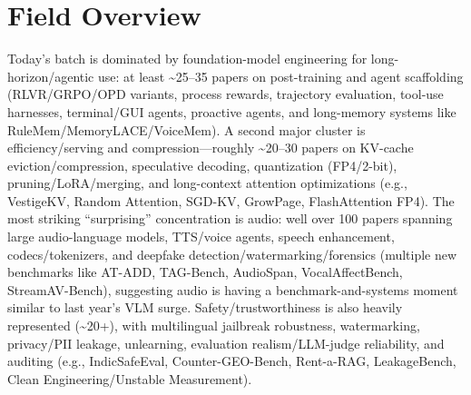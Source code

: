 \documentclass[12pt,letterpaper]{article}
\begin{document}
\section*{Field Overview}
{\footnotesize Today's batch is dominated by foundation-model engineering for long-horizon/agentic use: at least \textasciitilde{}25--35 papers on post-training and agent scaffolding (RLVR/GRPO/OPD variants, process rewards, trajectory evaluation, tool-use harnesses, terminal/GUI agents, proactive agents, and long-memory systems like RuleMem/MemoryLACE/VoiceMem). A second major cluster is efficiency/serving and compression---roughly \textasciitilde{}20--30 papers on KV-cache eviction/compression, speculative decoding, quantization (FP4/2-bit), pruning/LoRA/merging, and long-context attention optimizations (e.g., VestigeKV, Random Attention, SGD-KV, GrowPage, FlashAttention FP4). The most striking ``surprising'' concentration is audio: well over 100 papers spanning large audio-language models, TTS/voice agents, speech enhancement, codecs/tokenizers, and deepfake detection/watermarking/forensics (multiple new benchmarks like AT-ADD, TAG-Bench, AudioSpan, VocalAffectBench, StreamAV-Bench), suggesting audio is having a benchmark-and-systems moment similar to last year's VLM surge. Safety/trustworthiness is also heavily represented (\textasciitilde{}20+), with multilingual jailbreak robustness, watermarking, privacy/PII leakage, unlearning, evaluation realism/LLM-judge reliability, and auditing (e.g., IndicSafeEval, Counter-GEO-Bench, Rent-a-RAG, LeakageBench, Clean Engineering/Unstable Measurement).}
\end{document}
